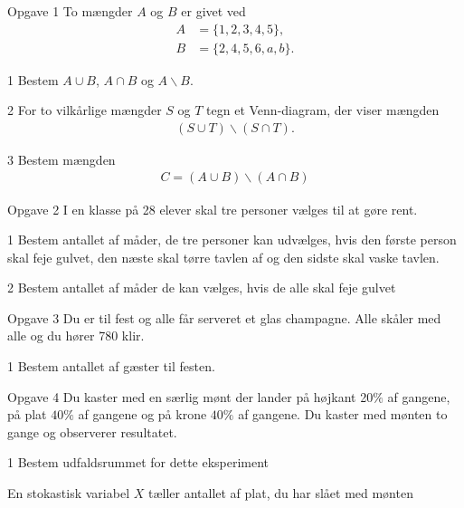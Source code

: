 \documentclass[12pt,x11names,a4paper]{article}
\begin{document}
\newpage



\begin{opgavetekst}{Opgave 1}
	To mængder $A$ og $B$ er givet ved
	\begin{align*}
		A &= \{1,2,3,4,5\},  \\
		B &= \{2,4,5,6,a,b\}.
	\end{align*}
\end{opgavetekst}
\begin{delopgave}{}{1}
	Bestem $A \cup B$, $A \cap B$ og $A \backslash B$.
\end{delopgave}
\begin{delopgave}{}{2}
	For to vilkårlige mængder $S$ og $T$ tegn et Venn-diagram, der viser mængden
	\begin{align*}
		(S \cup T) \backslash (S \cap T).
	\end{align*}
\end{delopgave}

\begin{delopgave}{}{3}
	Bestem mængden 
	\begin{align*}
		C = (A \cup B) \backslash (A \cap B)
	\end{align*}
\end{delopgave}


\begin{opgavetekst}{Opgave 2}
	I en klasse på 28 elever skal tre personer vælges til at gøre rent.
\end{opgavetekst}
\begin{delopgave}{}{1}
	Bestem antallet af måder, de tre personer kan udvælges, hvis den første person skal feje 
	gulvet, den næste skal tørre tavlen af og den sidste skal vaske tavlen.
\end{delopgave}
\begin{delopgave}{}{2}
	Bestem antallet af måder de kan vælges, hvis de alle skal feje gulvet
\end{delopgave}

\begin{opgavetekst}{Opgave 3}
	Du er til fest og alle får serveret et glas champagne. Alle skåler med alle og du hører 780
	klir.
\end{opgavetekst}
\begin{delopgave}{}{1}
	Bestem antallet af gæster til festen. 
\end{delopgave}

\newpage

\begin{opgavetekst}{Opgave 4}
	Du kaster med en særlig mønt der lander på højkant 20$\%$ af gangene, på plat $40\%$ af 
	gangene og på krone $40\%$ af gangene. Du kaster med mønten to gange og observerer 
	resultatet.
\end{opgavetekst}
\begin{delopgave}{}{1}
	Bestem udfaldsrummet for dette eksperiment
\end{delopgave}
\begin{meretekst}
	En stokastisk variabel $X$ tæller antallet af plat, du har slået med mønten
\end{meretekst}
\end{document}
